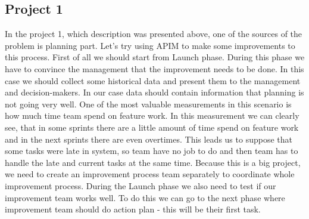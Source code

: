 \subsection*{Project 1}
In the project 1, which description was presented above, one of the sources of the problem is planning part. Let's try using APIM to make some improvements to this process. First of all we should start from Launch phase. During this phase we have to convince the management that the improvement needs to be done. In this case we should collect some historical data and present them to the management and decision-makers. In our case data should contain information that planning is not going very well. One of the most valuable measurements in this scenario is how much time team spend on feature work. In this measurement we can clearly see, that in some sprints there are a little amount of time spend on feature work and in the next sprints there are even overtimes. 
This leads us to suppose that some tasks were late in system, so team have no job to do and then team has to handle the late and current tasks at the same time. Because this is a big project, we need to create an improvement process team separately to coordinate whole improvement process. During the Launch phase we also need to test if our improvement team works well. To do this we can go to the next phase where improvement team should do action plan - this will be their first task.


